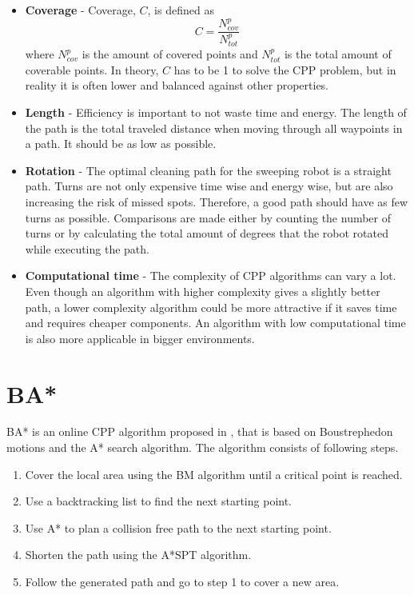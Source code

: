 \begin{itemize}
    \item \textbf{Coverage} - Coverage, $C$, is defined as
    \begin{equation}
        C =\frac{N^p_{cov}}{N^p_{tot}} 
    \end{equation}
    where $N^p_{cov}$ is the amount of covered points and $N^p_{tot}$ is the total amount of coverable points. In theory, $C$ has to be 1 to solve the CPP problem, but in reality it is often lower and balanced against other properties.
    \item \textbf{Length} - Efficiency is important to not waste time and energy. The length of the path is the total traveled distance when moving through all waypoints in a path. It should be as low as possible.
    \item \textbf{Rotation} - The optimal cleaning path for the sweeping robot is a straight path. Turns are not only expensive time wise and energy wise, but are also increasing the risk of missed spots. Therefore, a good path should have as few turns as possible. Comparisons are made either by counting the number of turns or by calculating the total amount of degrees that the robot rotated while executing the path. 
    \item \textbf{Computational time} - The complexity of CPP algorithms can vary a lot. Even though an algorithm with higher complexity gives a slightly better path, a lower complexity algorithm could be more attractive if it saves time and requires cheaper components. An algorithm with low computational time is also more applicable in bigger environments. 
    
\end{itemize}



\section{BA*}
\label{sec:BAstar}
BA* is an online CPP algorithm proposed in \cite{bastar}, that is based on Boustrephedon motions and the A* search algorithm. The algorithm consists of following steps.

\begin{enumerate}
    \item Cover the local area using the BM algorithm until a critical point is reached.
    \item Use a backtracking list to find the next starting point.
    \item Use A* to plan a collision free path to the next starting point.
    \item Shorten the path using the A*SPT algorithm.
    \item Follow the generated path and go to step 1 to cover a new area.
\end{enumerate}

